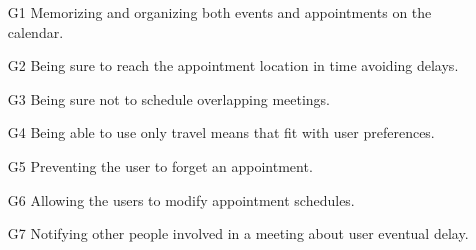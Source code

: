 \begin{itemize}

\item[\hypertarget{G1}{G1}]  Memorizing and organizing both events and appointments on the calendar. 

\item[\hypertarget{G2}{G2}] Being sure to reach the appointment location in time avoiding delays. \label{G2}

\item[\hypertarget{G3}{G3}] Being sure not to schedule overlapping meetings. \label{G3}

\item[\hypertarget{G4}{G4}] Being able to use only travel means that fit with user preferences. \label{G4}

\item[\hypertarget{G5}{G5}] Preventing the user to forget an appointment. \label{G5}

\item[\hypertarget{G6}{G6}] Allowing the users to modify appointment schedules. \label{G6}

\item[\hypertarget{G7}{G7}] Notifying other people involved in a meeting about user eventual delay. \label{G7}

\end{itemize}